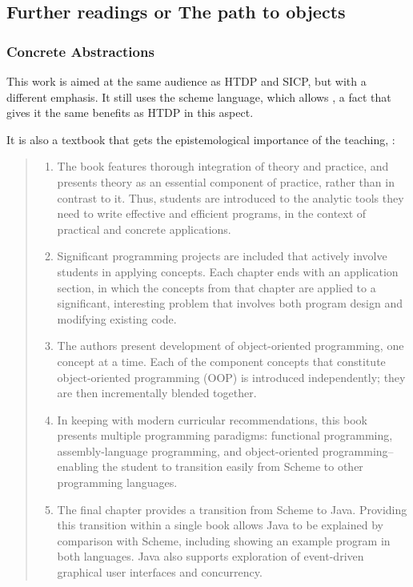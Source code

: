 \subsection{Further readings or The path to objects}

\subsubsection{Concrete Abstractions}

This  work is aimed at the same audience as HTDP and SICP, but with a different
emphasis. It still uses the scheme language, which allows , a fact
that gives it the same benefits as HTDP in this aspect.

It is also a textbook that gets the epistemological importance of the teaching,
:

\begin{quote}
    \begin{enumerate}
        \item  The book features thorough integration of theory and practice,
        and presents theory as an essential component of practice, rather than
        in contrast to it. Thus, students are introduced to the analytic tools
        they need to write effective and efficient programs, in the context of
        practical and concrete applications.

        \item Significant programming projects are included that actively
        involve students in applying concepts. Each chapter ends with an
        application section, in which the concepts from that chapter are applied
        to a significant, interesting problem that involves both program design
        and modifying existing code.
        
        \item The authors present development of object-oriented programming,
        one concept at a time. Each of the component concepts that constitute
        object-oriented programming (OOP) is introduced independently; they are
        then incrementally blended together.

        \item In keeping with modern curricular recommendations, this book
        presents multiple programming paradigms: functional programming,
        assembly-language programming, and object-oriented programming--enabling
        the student to transition easily from Scheme to other programming
        languages.

        \item The final chapter provides a transition from Scheme to Java.
        Providing this transition within a single book allows Java to be
        explained by comparison with Scheme, including showing an example
        program in both languages. Java also supports exploration of
        event-driven graphical user interfaces and concurrency. 
    \end{enumerate}
\end{quote}

